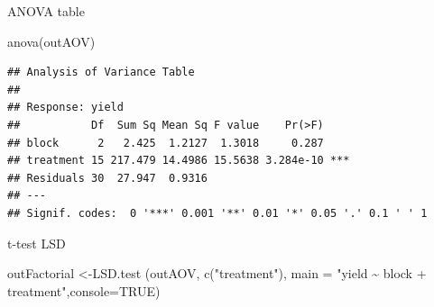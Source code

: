 \documentclass[
]{book}
\newenvironment{Shaded}{\begin{snugshade}}{\end{snugshade}}
\newcommand{\AttributeTok}[1]{\textcolor[rgb]{0.77,0.63,0.00}{#1}}
\newcommand{\ConstantTok}[1]{\textcolor[rgb]{0.00,0.00,0.00}{#1}}
\newcommand{\FunctionTok}[1]{\textcolor[rgb]{0.00,0.00,0.00}{#1}}
\newcommand{\NormalTok}[1]{#1}
\newcommand{\OtherTok}[1]{\textcolor[rgb]{0.56,0.35,0.01}{#1}}
\newcommand{\StringTok}[1]{\textcolor[rgb]{0.31,0.60,0.02}{#1}}
\theoremstyle{definition}
\theoremstyle{definition}
\theoremstyle{definition}
\theoremstyle{definition}
\theoremstyle{remark}
\begin{document}
ANOVA table

\begin{Shaded}
\begin{Highlighting}[]
\FunctionTok{anova}\NormalTok{(outAOV)}
\end{Highlighting}
\end{Shaded}

\begin{verbatim}
## Analysis of Variance Table
## 
## Response: yield
##           Df  Sum Sq Mean Sq F value    Pr(>F)    
## block      2   2.425  1.2127  1.3018     0.287    
## treatment 15 217.479 14.4986 15.5638 3.284e-10 ***
## Residuals 30  27.947  0.9316                      
## ---
## Signif. codes:  0 '***' 0.001 '**' 0.01 '*' 0.05 '.' 0.1 ' ' 1
\end{verbatim}

t-test LSD

\begin{Shaded}
\begin{Highlighting}[]
\NormalTok{outFactorial }\OtherTok{\textless{}{-}}\FunctionTok{LSD.test}\NormalTok{ (outAOV, }\FunctionTok{c}\NormalTok{(}\StringTok{"treatment"}\NormalTok{), }\AttributeTok{main =} \StringTok{"yield \textasciitilde{} block + treatment"}\NormalTok{,}\AttributeTok{console=}\ConstantTok{TRUE}\NormalTok{)}
\end{Highlighting}
\end{Shaded}
\end{document}
